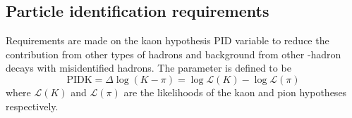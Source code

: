 \subsection{Particle identification requirements}
\label{sec:pidrequirements}
Requirements are made on the kaon hypothesis PID variable to reduce the contribution from other types of hadrons and background from other \bquark-hadron decays with misidentified hadrons. 
The parameter is defined to be
\begin{equation}
\text{PIDK} = \Delta \log(K - \pi) = \log\mathcal{L}(K) - \log\mathcal{L}(\pi)
\end{equation}
where $\mathcal{L}(K)$ and $\mathcal{L}(\pi)$ are the likelihoods of the kaon and pion hypotheses respectively.


